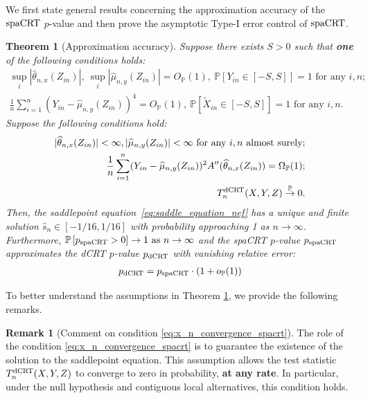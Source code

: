 \documentclass[12pt]{article}
\newtheorem{theorem}{Theorem}
\theoremstyle{definition}
\newtheorem{remark}{Remark}
\def\P{\mathbb{P}}
\def\P{\mathbb{P}}
\renewcommand{\P}{\mathbb{P}}							%
\newcommand{\convp}{\overset{\mathbb{P}}{\rightarrow}}             %
\newcommand{\srx}{X}									%
\newcommand{\srz}{Z}									%
\newcommand{\srxk}{\widetilde X}						%
\newcommand{\sry}{Y}									%
\newcommand{\dCRT}{\textnormal{dCRT}} 					%
\newcommand{\spacrt}{\textnormal{spaCRT}}               %
\begin{document}
  We first state general results concerning the approximation accuracy of the $\spacrt$ $p$-value and then prove the asymptotic Type-I error control of $\spacrt$.
  
  \begin{theorem}[Approximation accuracy]\label{thm:validity_spacrt}
	Suppose there exists $S>0$ such that \textbf{one} of the following conditions holds:
	\begin{align}
	  \sup_{i}|\widehat{\theta}_{n,x}(\srz_{in})|,\ \sup_{i}|\widehat{\mu}_{n,y}(\srz_{in})| = O_{\P}(1),\  \P[\sry_{in}\in [-S,S]]=1\text{ for any }i,n\label{eq:cse_assumption}\tag{CSE};\\
	  \frac{1}{n}\sum_{i=1}^n (\sry_{in}-\widehat{\mu}_{n,y}(\srz_{in}))^4=O_{\P}(1),\ \P\left[\srxk_{in}\in [-S,S]\right]=1\text{ for any }i,n\label{eq:ccs_assumption}\tag{CCS}.
	\end{align}
	  Suppose the following conditions hold:
	  \begin{align}
		  |\widehat \theta_{n,x}(\srz_{in})|<\infty,|\widehat \mu_{n,y}(\srz_{in})|<\infty\text{ for any $i,n$ almost surely};\label{eq:upper_bound_theta_a} \\
		  \frac{1}{n}\sum_{i=1}^n (Y_{in}-\widehat{\mu}_{n,y}(Z_{in}))^2 A''(\widehat \theta_{n,x}(\srz_{in}))=\Omega_{\P}(1);\label{eq:lower_bound_spacrt}\\
		  T_n^{\dCRT}(\srx,\sry,\srz)\convp 0\label{eq:x_n_convergence_spacrt}.
	  \end{align}
	  Then, the saddlepoint equation~\eqref{eq:saddle_equation_nef} has a unique and finite solution $\hat s_n \in [-1/16, 1/16]$ with probability approaching 1 as $n \rightarrow \infty$. Furthermore, $\P\left[p_{\spacrt}>0\right]\rightarrow1 \text{ as }n\rightarrow\infty$ and the spaCRT $p$-value $p_{\spacrt}$ approximates the dCRT $p$-value $p_{\dCRT}$ with vanishing relative error:
	  \begin{align}\label{eq:approximation_accuracy_spacrt}
		  p_{\dCRT} = p_{\spacrt}\cdot (1+o_\P(1))
	  \end{align}
  \end{theorem}
  
  \noindent To better understand the assumptions in Theorem \ref{thm:validity_spacrt}, we provide the following remarks.
  
  \begin{remark}[Comment on condition \eqref{eq:x_n_convergence_spacrt}]\label{rmk:cutoff-regime}
	The role of the condition \eqref{eq:x_n_convergence_spacrt} is to guarantee the existence of the solution to the saddlepoint equation. This assumption allows the test statistic $T_n^{\dCRT}(\srx,\sry,\srz)$ to converge to zero in probability, \textbf{at any rate}. In particular, under the null hypothesis and contiguous local alternatives, this condition holds.
  \end{remark}
  
\end{document}
